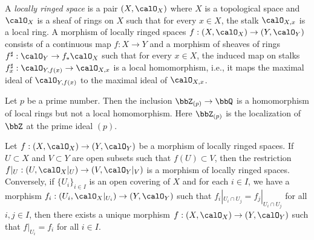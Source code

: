     \begin{definition}\label{def:locally_ringed_space}
        A \emph{locally ringed space} is a pair \((X, \calO_X)\) where \(X\) is a topological space and \(\calO_X\) is a sheaf of rings on \(X\) such that for every \(x \in X\), the stalk \(\calO_{X,x}\) is a local ring.
        A morphism of locally ringed spaces \(f : (X, \calO_X) \to (Y, \calO_Y)\) consists of a continuous map \(f : X \to Y\) and a morphism of sheaves of rings \(f^\sharp : \calO_Y \to f_*\calO_X\) 
        such that for every \(x \in X\), the induced map on stalks \(f_x^\sharp : \calO_{Y,f(x)} \to \calO_{X,x}\) is a local homomorphism, 
        i.e., it maps the maximal ideal of \(\calO_{Y,f(x)}\) to the maximal ideal of \(\calO_{X,x}\).
    \end{definition}

    \begin{example}\label{eg:non_local_homomorphism_of_local_rings}
        Let \(p\) be a prime number.
        Then the inclusion \(\bbZ_{(p)} \to \bbQ\) is a homomorphism of local rings but not a local homomorphism.
        Here \(\bbZ_{(p)}\) is the localization of \(\bbZ\) at the prime ideal \((p)\).
    \end{example}

    \begin{example}\label{eg:glue_morphisms_of_locally_ringed_spaces}
        Let \(f : (X, \calO_X) \to (Y, \calO_Y)\) be a morphism of locally ringed spaces.
        If \(U \subset X\) and \(V \subset Y\) are open subsets such that \(f(U) \subset V\), then the restriction \(f|_U : (U, \calO_X|_U) \to (V, \calO_Y|_V)\) is a morphism of locally ringed spaces.
        Conversely, if \(\{U_i\}_{i \in I}\) is an open covering of \(X\) and for each \(i \in I\), we have a morphism \(f_i : (U_i, \calO_X|_{U_i}) \to (Y, \calO_Y)\) such that \(f_i|_{U_i \cap U_j} = f_j|_{U_i \cap U_j}\) for all \(i,j \in I\),
        then there exists a unique morphism \(f : (X, \calO_X) \to (Y, \calO_Y)\) such that \(f|_{U_i} = f_i\) for all \(i \in I\).
    \end{example}

